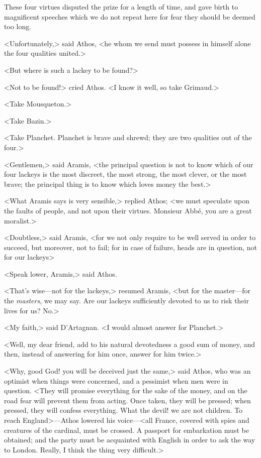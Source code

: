 These four virtues disputed the prize for a length of time, and gave birth to magnificent speeches which we do not repeat here for fear they should be deemed too long. 

<Unfortunately,> said Athos, <he whom we send must possess in himself alone the four qualities united.> 

<But where is such a lackey to be found?> 

<Not to be found!> cried Athos. <I know it well, so take Grimaud.> 

<Take Mousqueton.> 

<Take Bazin.> 

<Take Planchet. Planchet is brave and shrewd; they are two qualities out of the four.> 

<Gentlemen,> said Aramis, <the principal question is not to know which of our four lackeys is the most discreet, the most strong, the most clever, or the most brave; the principal thing is to know which loves money the best.> 

<What Aramis says is very sensible,> replied Athos; <we must speculate upon the faults of people, and not upon their virtues. Monsieur Abbé, you are a great moralist.> 

<Doubtless,> said Aramis, <for we not only require to be well served in order to succeed, but moreover, not to fail; for in case of failure, heads are in question, not for our lackeys\longdash> 

<Speak lower, Aramis,> said Athos. 

<That's wise—not for the lackeys,> resumed Aramis, <but for the master—for the \emph{masters}, we may say. Are our lackeys sufficiently devoted to us to risk their lives for us? No.> 

<My faith,> said D'Artagnan. <I would almost answer for Planchet.> 

<Well, my dear friend, add to his natural devotedness a good sum of money, and then, instead of answering for him once, answer for him twice.> 

<Why, good God! you will be deceived just the same,> said Athos, who was an optimist when things were concerned, and a pessimist when men were in question. <They will promise everything for the sake of the money, and on the road fear will prevent them from acting. Once taken, they will be pressed; when pressed, they will confess everything. What the devil! we are not children. To reach England>—Athos lowered his voice—<all France, covered with spies and creatures of the cardinal, must be crossed. A passport for embarkation must be obtained; and the party must be acquainted with English in order to ask the way to London. Really, I think the thing very difficult.> 

